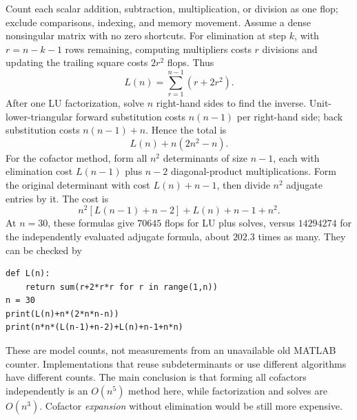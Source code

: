 Count each scalar addition, subtraction, multiplication, or division as one flop; exclude comparisons, indexing, and memory movement. Assume a dense nonsingular matrix with no zero shortcuts. For elimination at step $k$, with $r=n-k-1$ rows remaining, computing multipliers costs $r$ divisions and updating the trailing square costs $2r^2$ flops. Thus
\[
 L(n)=\sum_{r=1}^{n-1}(r+2r^2).
\]
After one LU factorization, solve $n$ right-hand sides to find the inverse. Unit-lower-triangular forward substitution costs $n(n-1)$ per right-hand side; back substitution costs $n(n-1)+n$. Hence the total is
\[
 L(n)+n(2n^2-n).
\]
For the cofactor method, form all $n^2$ determinants of size $n-1$, each with elimination cost $L(n-1)$ plus $n-2$ diagonal-product multiplications. Form the original determinant with cost $L(n)+n-1$, then divide $n^2$ adjugate entries by it. The cost is
\[
 n^2[L(n-1)+n-2]+L(n)+n-1+n^2.
\]
At $n=30$, these formulas give $70645$ flops for LU plus solves, versus $14294274$ for the independently evaluated adjugate formula, about $202.3$ times as many. They can be checked by
\begin{verbatim}
def L(n):
    return sum(r+2*r*r for r in range(1,n))
n = 30
print(L(n)+n*(2*n*n-n))
print(n*n*(L(n-1)+n-2)+L(n)+n-1+n*n)
\end{verbatim}
These are model counts, not measurements from an unavailable old MATLAB counter. Implementations that reuse subdeterminants or use different algorithms have different counts. The main conclusion is that forming all cofactors independently is an $O(n^5)$ method here, while factorization and solves are $O(n^3)$. Cofactor \emph{expansion} without elimination would be still more expensive.
